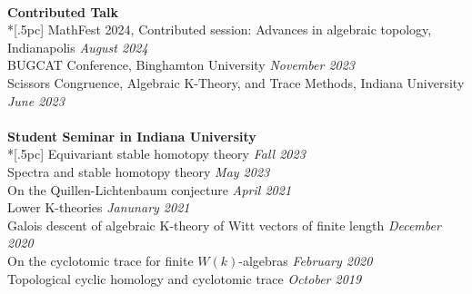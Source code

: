 \documentclass{article}
\begin{document}
\\
{\bf \large Contributed Talk} \\*[.5pc]
{MathFest 2024, Contributed session: Advances in algebraic topology, Indianapolis} \hfill {\it August 2024\/}  \\
{BUGCAT Conference, Binghamton University} \hfill {\it November 2023\/}  \\
{Scissors Congruence, Algebraic K-Theory, and Trace Methods, Indiana University} \hfill {\it June 2023\/}  \\
\\
{\bf \large Student Seminar in Indiana University} \\*[.5pc]
{Equivariant stable homotopy theory} \hfill {\it Fall 2023\/} \\
{Spectra and stable homotopy theory} \hfill {\it May 2023\/} \\
{On the Quillen-Lichtenbaum conjecture} \hfill {\it April 2021\/} \\
{Lower K-theories} \hfill {\it Janunary 2021\/} \\
{Galois descent of algebraic K-theory of Witt vectors of finite length} \hfill {\it December 2020\/} \\
{On the cyclotomic trace for finite $W(k)$-algebras} \hfill {\it February 2020\/} \\
{Topological cyclic homology and cyclotomic trace} \hfill {\it October 2019\/} \\
\end{document}
